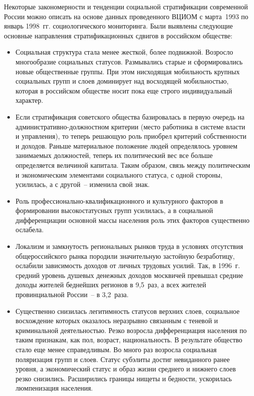   Некоторые закономерности и тенденции социальной стратификации современной
  России можно описать на основе данных проведенного ВЦИОМ с марта~1993 по
  январь 1998~гг. социологического мониторинга. Были выявлены следующие
  основные направления стратификационных сдвигов в российском обществе:
  \begin{itemize}
    \item Социальная структура стала менее жесткой, более подвижной. Возросло
      многообразие социальных статусов. Размывались старые и сформировались
      новые общественные группы. При этом нисходящая мобильность крупных
      социальных групп и слоев доминирует над восходящей мобильностью, которая
      в российском обществе носит пока еще строго индивидуальный характер.
    \item Если стратификация советского общества базировалась в первую очередь
      на административно-должностном критерии (место работника в системе власти
      и управления), то теперь решающую роль приобрел критерий собственности и
      доходов. Раньше материальное положение людей определялось уровнем
      занимаемых должностей, теперь их политический вес все больше определяется
      величиной капитала. Таким образом, связь между политическим и
      экономическим элементами социального статуса, с одной стороны, усилилась,
      а с другой~-- изменила свой знак.
    \item Роль профессионально-квалификационного и культурного факторов в
      формировании высокостатусных групп усилилась, а в социальной
      дифференциации основной массы населения роль этих факторов существенно
      ослабела.
    \item Локализм и замкнутость региональных рынков труда в условиях
      отсутствия общероссийского рынка породили значительную застойную
      безработицу, ослабили зависимость доходов от личных трудовых усилий. Так,
      в 1996~г. средний уровень душевых денежных доходов москвичей превышал
      средние доходы жителей беднейших регионов в 9,5~раз, а всех жителей
      провинциальной России~-- в 3,2~раза.
    \item Существенно снизилась легитимность статусов верхних слоев, социальное
      восхождение которых оказалось неразрывно связанным с теневой и
      криминальной деятельностью. Резко возросла дифференциация населения по
      таким признакам, как пол, возраст, национальность. В результате общество
      стало еще менее справедливым. Во много раз возросла социальная
      поляризация групп и слоев. Статус субэлиты достиг невиданного ранее
      уровня, а экономический статус и образ жизни среднего и нижнего слоев
      резко снизились. Расширились границы нищеты и бедности, ускорилась
      люмпенизация населения.
  \end{itemize}
